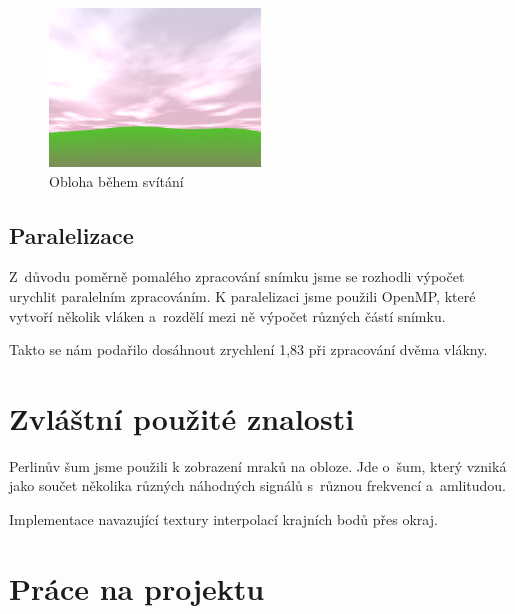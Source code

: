 \documentclass[12pt,a4paper,titlepage,final]{report}
\begin{document}
\begin{figure}[h] \centering
        \includegraphics[width=0.5\textwidth]{images/sky2.png}
    \caption{Obloha během svítání} \label{fig:sky_dawn}
\end{figure}


\section{Paralelizace}

Z~důvodu poměrně pomalého zpracování snímku jsme se rozhodli výpočet
urychlit paralelním zpracováním. K paralelizaci jsme použili OpenMP,
které vytvoří několik vláken a~rozdělí mezi ně výpočet různých
částí snímku.

Takto se nám podařilo dosáhnout zrychlení 1,83 při zpracování dvěma
vlákny.

\chapter{Zvláštní použité znalosti}


Perlinův šum\cite{cite1, cite2} jsme použili k zobrazení mraků na obloze. Jde
o~šum, který vzniká jako součet několika různých náhodných signálů s~různou
frekvencí a~amlitudou.

Implementace navazující textury interpolací krajních bodů přes okraj.


\chapter{Práce na projektu}
\end{document}
